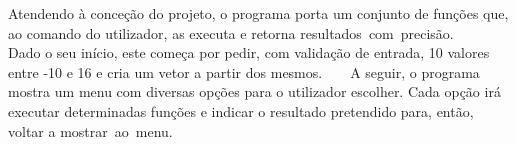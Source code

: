 Atendendo à conceção do projeto, o programa porta um conjunto de funções que, ao comando do utilizador, as executa e retorna resultados~com~precisão. ~\newline
 ~\newline
Dado o seu início, este começa por pedir, com validação de entrada, 10 valores entre -\/10 e 16 e cria um vetor a partir dos mesmos. ~\newline
 ~\newline
A seguir, o programa mostra um menu com diversas opções para o utilizador escolher. Cada opção irá executar determinadas funções e indicar o resultado pretendido para, então, voltar a mostrar~ao~menu. 